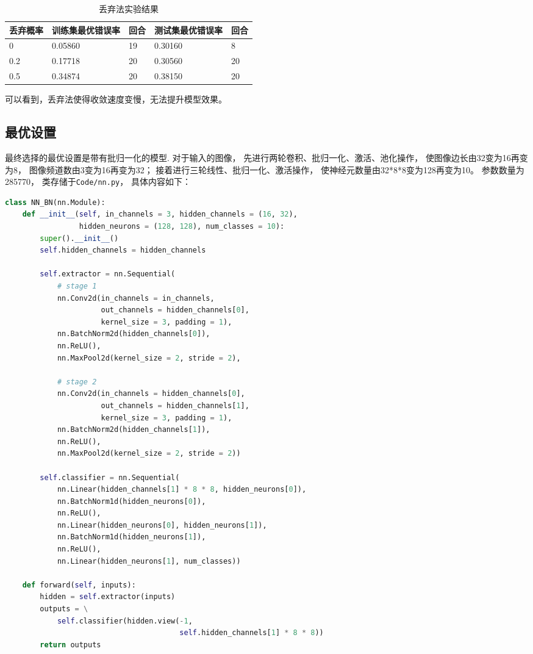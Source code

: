 \documentclass{article}
\begin{document}
\begin{table}[h]
\centering
\begin{tabular}{|l|l|l|l|l|} 
\hline
丢弃概率 & 训练集最优错误率 & 回合 & 测试集最优错误率 & 回合 \\
\hline
0 & 0.05860 & 19 & 0.30160 & 8 \\
0.2 & 0.17718 & 20 & 0.30560 & 20 \\
0.5 & 0.34874 & 20 & 0.38150 & 20 \\
\hline
\end{tabular}
\caption{丢弃法实验结果}
\label{table:dropout}
\end{table}

可以看到，丢弃法使得收敛速度变慢，无法提升模型效果。

\subsection{最优设置}

最终选择的最优设置是带有批归一化的模型.
对于输入的图像，
先进行两轮卷积、批归一化、激活、池化操作，
使图像边长由32变为16再变为8，
图像频道数由3变为16再变为32；
接着进行三轮线性、批归一化、激活操作，
使神经元数量由32*8*8变为128再变为10。
参数数量为285770，
类存储于\verb|Code/nn.py|，
具体内容如下：

\begin{lstlisting}[language=Python]
class NN_BN(nn.Module):
    def __init__(self, in_channels = 3, hidden_channels = (16, 32),
                 hidden_neurons = (128, 128), num_classes = 10):
        super().__init__()
        self.hidden_channels = hidden_channels

        self.extractor = nn.Sequential(
            # stage 1
            nn.Conv2d(in_channels = in_channels,
                      out_channels = hidden_channels[0],
                      kernel_size = 3, padding = 1),
            nn.BatchNorm2d(hidden_channels[0]),
            nn.ReLU(),
            nn.MaxPool2d(kernel_size = 2, stride = 2),

            # stage 2
            nn.Conv2d(in_channels = hidden_channels[0],
                      out_channels = hidden_channels[1],
                      kernel_size = 3, padding = 1),
            nn.BatchNorm2d(hidden_channels[1]),
            nn.ReLU(),
            nn.MaxPool2d(kernel_size = 2, stride = 2))

        self.classifier = nn.Sequential(
            nn.Linear(hidden_channels[1] * 8 * 8, hidden_neurons[0]),
            nn.BatchNorm1d(hidden_neurons[0]),
            nn.ReLU(),
            nn.Linear(hidden_neurons[0], hidden_neurons[1]),
            nn.BatchNorm1d(hidden_neurons[1]),
            nn.ReLU(),
            nn.Linear(hidden_neurons[1], num_classes))

    def forward(self, inputs):
        hidden = self.extractor(inputs)
        outputs = \
            self.classifier(hidden.view(-1,
                                        self.hidden_channels[1] * 8 * 8))
        return outputs
\end{lstlisting}
\end{document}
